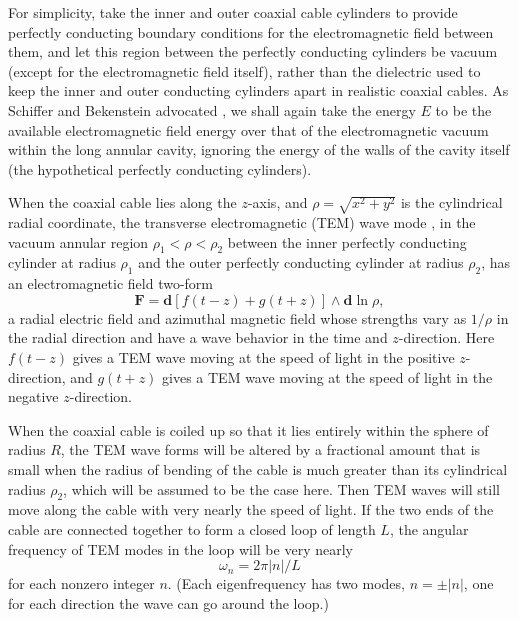 \documentclass[a4paper,12pt]{article}
\begin{document}
	For simplicity, take the inner and outer coaxial
cable cylinders to provide perfectly conducting
boundary conditions for the electromagnetic field
between them, and let this region between
the perfectly conducting cylinders be vacuum
(except for the electromagnetic field itself),
rather than the dielectric used
to keep the inner and outer conducting cylinders apart
in realistic coaxial cables.
As Schiffer and Bekenstein advocated
\cite{SB1},
we shall again take the energy $E$ to be the available
electromagnetic field energy over that
of the electromagnetic vacuum within the long annular cavity,
ignoring the energy of the walls of the cavity itself
(the hypothetical perfectly conducting cylinders).

	When the coaxial cable lies along the $z$-axis,
and $\rho = \sqrt{x^2 + y^2}$
is the cylindrical radial coordinate,
the transverse electromagnetic (TEM) wave mode
\cite{Jackson75},
in the vacuum annular region $\rho_1 < \rho < \rho_2$
between the inner perfectly conducting cylinder
at radius $\rho_1$
and the outer perfectly conducting cylinder
at radius $\rho_2$,
has an electromagnetic field two-form
 \begin{equation}
 \mathbf{F} = \mathbf{d}[f(t-z)+g(t+z)]
 \wedge \mathbf{d}\ln{\rho},
 \label{eq:14}
 \end{equation}
a radial electric field and azimuthal magnetic field
whose strengths vary as $1/\rho$ in the radial direction
and have a wave behavior in the time and $z$-direction.
Here $f(t-z)$ gives a TEM wave moving at the speed of light
in the positive $z$-direction, and $g(t+z)$ gives
a TEM wave moving at the speed of light in the
negative $z$-direction.

	When the coaxial cable is coiled up
so that it lies entirely within the sphere of radius $R$,
the TEM wave forms will be altered
by a fractional amount that is small
when the radius of bending of the cable is much greater
than its cylindrical radius $\rho_2$, which will be
assumed to be the case here.  Then TEM waves will
still move along the cable with very nearly the
speed of light.  If the two ends of the cable are connected
together to form a closed loop of length $L$,
the angular frequency of TEM modes in the loop
will be very nearly
 \begin{equation}
 \omega_n = 2\pi |n|/L
 \label{eq:15}
 \end{equation}
for each nonzero integer $n$.
(Each eigenfrequency has two modes, $n = \pm |n|$, one for each
direction the wave can go around the loop.)
\end{document}
